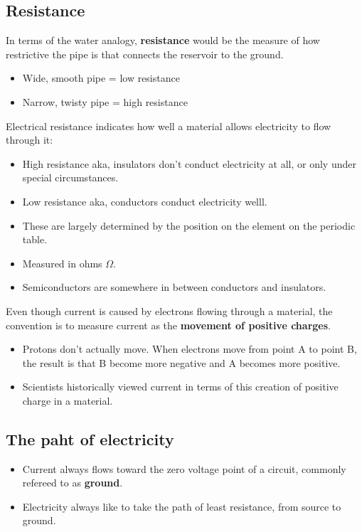 \documentclass[12pt]{article}
\theoremstyle{definition}
\begin{document}
\subsection{Resistance}
In terms of the water analogy, \textbf{resistance} would be the measure of how restrictive the pipe is that connects the reservoir to the ground.
\begin{itemize}
    \item Wide, smooth pipe = low resistance
    \item Narrow, twisty pipe = high resistance
\end{itemize}
Electrical resistance indicates how well a material allows electricity to flow through it:
\begin{itemize}
    \item High resistance aka, insulators don't conduct electricity at all, or only under special circumstances.
    \item Low resistance aka, conductors conduct electricity welll.
    \item These are largely determined by the position on the element on the periodic table.
    \item Measured in ohms $\Omega$.
    \item Semiconductors are somewhere in between conductors and insulators.
\end{itemize}
Even though current is caused by electrons flowing through a material, the convention is to measure current as the \textbf{movement of positive charges}.\\
\begin{itemize}
    \item Protons don't actually move. When electrons move from point A to point B, the result is that B become more negative and A becomes more positive.
    \item Scientists historically viewed current in terms of this creation of positive charge in a material.
\end{itemize}
\subsection{The paht of electricity}
\begin{itemize}
    \item Current always flows toward the zero voltage point of a circuit, commonly refereed to as \textbf{ground}.
    \item Electricity always like to take the path of least resistance, from source to ground.
\end{itemize}
\end{document}
